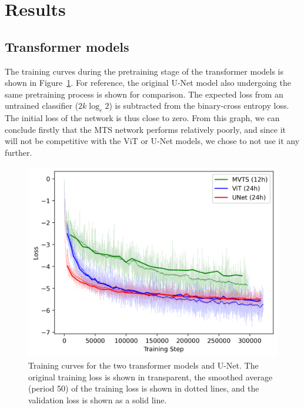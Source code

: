 \section{Results}
\label{sec:results}

\subsection{Transformer models}

The training curves during the pretraining stage of the transformer models is shown in Figure~\ref{fig:pretain_loss_curve}. For reference, the original U-Net model also undergoing the same pretraining process is shown for comparison. The expected loss from an untrained classifier ($2k\log_e2$) is subtracted from the binary-cross entropy loss. The initial loss of the network is thus close to zero. From this graph, we can conclude firstly that the MTS network performs relatively poorly, and since it will not be competitive with the ViT or U-Net models, we chose to not use it any further. 

\begin{figure}[htb]
  \centering
  \includegraphics[width=1\linewidth]{media/images/Pretraining_loss_curve.png}
  \caption{Training curves for the two transformer models and U-Net. The original training loss is shown in transparent, the smoothed average (period 50) of the training loss is shown in dotted lines, and the validation loss is shown as a solid line.}
  \label{fig:pretain_loss_curve}
\end{figure}

